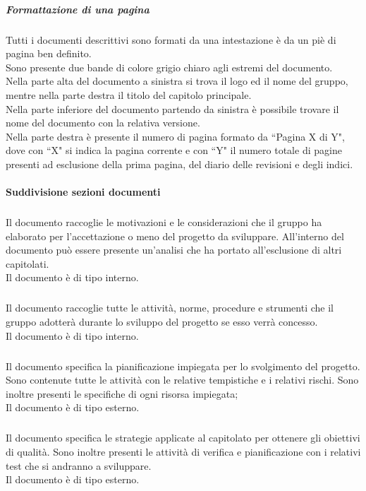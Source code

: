 				\subparagraph{Formattazione di una pagina}
				Tutti i documenti descrittivi sono formati da una intestazione è da un piè di pagina ben definito.\\
				Sono presente due bande di colore grigio chiaro agli estremi del documento.\\
				Nella parte alta del documento a sinistra si trova il logo ed il nome del gruppo, mentre nella parte destra il titolo del capitolo principale.\\
				Nella parte inferiore del documento partendo da sinistra è possibile trovare il nome del documento con la relativa versione.\\
				Nella parte destra è presente il numero di pagina formato da ``Pagina X di Y", dove con ``X" si indica la pagina corrente e con ``Y" il numero totale di pagine presenti ad esclusione della prima pagina, del diario delle revisioni e degli indici.

			\paragraph{Suddivisione sezioni documenti}

				\subparagraph{\docNameSdF} Il documento raccoglie le motivazioni e le considerazioni che il gruppo ha elaborato per l'accettazione o meno del progetto da sviluppare. All'interno del documento può essere presente un'analisi che ha portato all'esclusione di altri capitolati.\\
				Il documento è di tipo interno.

				\subparagraph{\docNameNdP} Il documento raccoglie tutte le attività, norme, procedure e strumenti che il gruppo adotterà durante lo sviluppo del progetto se esso verrà concesso.\\
				Il documento è di tipo interno.
				
				\subparagraph{\docNamePdP} Il documento specifica la pianificazione impiegata per lo svolgimento del progetto. Sono contenute tutte le attività con le relative tempistiche e i relativi rischi. Sono inoltre presenti le specifiche di ogni risorsa impiegata;\\
				Il documento è di tipo esterno.

				\subparagraph{\docNamePdQ} Il documento specifica le strategie applicate al capitolato per ottenere gli obiettivi di qualità. Sono inoltre presenti le attività di verifica e pianificazione con i relativi test che si andranno a sviluppare. \\
				Il documento è di tipo esterno.

